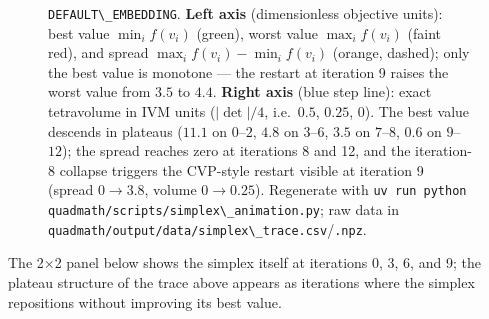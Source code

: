 \documentclass[
  10pt,
]{article}
\newcommand{\passthrough}[1]{#1}
\begin{document}
\begin{figure}
{\protect\passthrough{\lstinline!DEFAULT\_EMBEDDING!}. \textbf{Left axis}
(dimensionless objective units): best value \(\min_i f(v_i)\) (green),
worst value \(\max_i f(v_i)\) (faint red), and spread
\(\max_i f(v_i) - \min_i f(v_i)\) (orange, dashed); only the best value
is monotone --- the restart at iteration 9 raises the worst value from
\(3.5\) to \(4.4\). \textbf{Right axis} (blue step line): exact
tetravolume in IVM units (\(\lvert\det\rvert/4\), i.e.~\(0.5\),
\(0.25\), \(0\)). The best value descends in plateaus (\(11.1\) on
\(0\)--\(2\), \(4.8\) on \(3\)--\(6\), \(3.5\) on \(7\)--\(8\), \(0.6\)
on \(9\)--\(12\)); the spread reaches zero at iterations 8 and 12, and
the iteration-8 collapse triggers the CVP-style restart visible at
iteration 9 (spread \(0 \to 3.8\), volume \(0 \to 0.25\)). Regenerate
with
\protect\passthrough{\lstinline!uv run python quadmath/scripts/simplex\_animation.py!};
raw data in
\protect\passthrough{\lstinline!quadmath/output/data/simplex\_trace.csv!}/\protect\passthrough{\lstinline!.npz!}.}
\end{figure}

The 2×2 panel below shows the simplex itself at iterations 0, 3, 6, and
9; the plateau structure of the trace above appears as iterations where
the simplex repositions without improving its best value.
\end{document}
